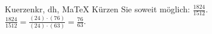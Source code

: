 \begin{MAufgabe}{Kuerzen}{kr, dh, MaTeX}
K\"urzen Sie soweit m\"oglich: $\frac{1824}{1512}$.\\ 
\ifLsg\MLoesung
\quad $\frac{1824}{1512}=\frac{(24)\cdot(76)}{(24)\cdot(63)}=\frac{76}{63}$.\else\relax\fi
 \end{MAufgabe}
